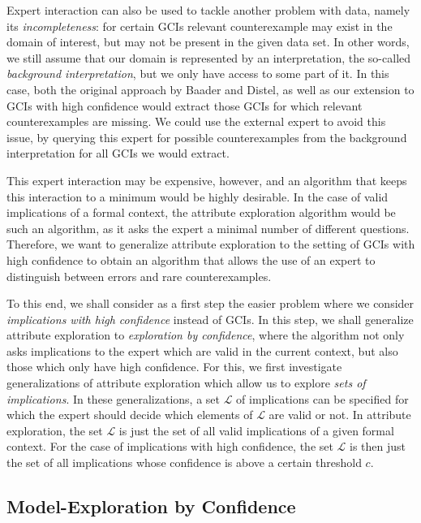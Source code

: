 Expert interaction can also be used to tackle another problem with data, namely its
\emph{incompleteness}: for certain GCIs relevant counterexample may exist in the domain of
interest, but may not be present in the given data set.  In other words, we still assume
that our domain is represented by an interpretation, the so-called \emph{background
  interpretation}, but we only have access to some part of it.  In this case, both the
original approach by Baader and Distel, as well as our extension to GCIs with high
confidence would extract those GCIs for which relevant counterexamples are missing.  We
could use the external expert to avoid this issue, by querying this expert for possible
counterexamples from the background interpretation for all GCIs we would extract.

This expert interaction may be expensive, however, and an algorithm that keeps this
interaction to a minimum would be highly desirable.  In the case of valid implications of
a formal context, the attribute exploration algorithm would be such an algorithm, as it
asks the expert a minimal number of different questions.  Therefore, we want to generalize
attribute exploration to the setting of GCIs with high confidence to obtain an algorithm
that allows the use of an expert to distinguish between errors and rare counterexamples.

To this end, we shall consider as a first step the easier problem where we consider
\emph{implications with high confidence} instead of GCIs.  In this step, we shall
generalize attribute exploration to \emph{exploration by confidence}, where the algorithm
not only asks implications to the expert which are valid in the current context, but also
those which only have high confidence.  For this, we first investigate generalizations of
attribute exploration which allow us to explore \emph{sets of implications}.  In these
generalizations, a set $\mathcal{L}$ of implications can be specified for which the expert
should decide which elements of $\mathcal{L}$ are valid or not.  In attribute exploration,
the set $\mathcal{L}$ is just the set of all valid implications of a given formal context.
For the case of implications with high confidence, the set $\mathcal{L}$ is then just the
set of all implications whose confidence is above a certain threshold $c$.

\subsection{Model-Exploration by Confidence}
\label{sec:model-expl-conf}


